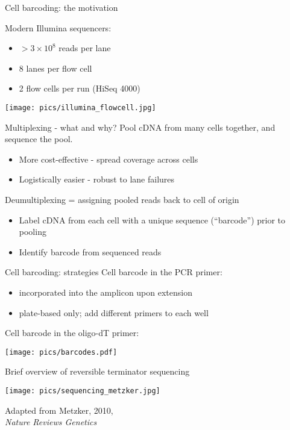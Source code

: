 \documentclass{beamer}
\begin{document}
\begin{frame}{Cell barcoding: the motivation}
\begin{minipage}{0.59\textwidth}
Modern Illumina sequencers:
\begin{itemize}
\item $> 3 \times 10^8$ reads per lane 
\item 8 lanes per flow cell
\item 2 flow cells per run (HiSeq 4000)
\end{itemize}
\end{minipage}
\begin{minipage}{0.39\textwidth}
\texttt{[image: pics/illumina\_flowcell.jpg]}
\end{minipage}
\pause
\begin{exampleblock}{Multiplexing - what and why?}
Pool cDNA from many cells together, and sequence the pool.
\begin{itemize}
\item More cost-effective - spread coverage across cells
\item Logistically easier - robust to lane failures
\end{itemize}
\end{exampleblock}
\pause
Deumultiplexing = assigning pooled reads back to cell of origin
\begin{itemize}
\item Label cDNA from each cell with a unique sequence (``barcode'') prior to pooling
\item Identify barcode from sequenced reads
\end{itemize}
\end{frame}

\begin{frame}{Cell barcoding: strategies}
Cell barcode in the PCR primer:
\begin{itemize}
\item incorporated into the amplicon upon extension 
\item plate-based only; add different primers to each well
\end{itemize}
Cell barcode in the oligo-dT primer:
\begin{center}
\texttt{[image: pics/barcodes.pdf]}
\end{center}
\end{frame}

\begin{frame}{Brief overview of reversible terminator sequencing}
\begin{minipage}{0.69\textwidth}
\texttt{[image: pics/sequencing\_metzker.jpg]} 
\end{minipage}
\begin{minipage}{0.29\textwidth}
{\tiny Adapted from Metzker, 2010, \\\textit{Nature Reviews Genetics}}
\end{minipage}
\end{frame}
\end{document}
